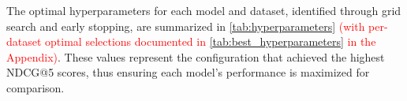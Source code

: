 %

\begin{table}[ht]
\centering
\begin{minipage}{\textwidth}
\begin{mmblock}
\caption{Evaluation results: mean$_{\pm \text{standard deviation}}$ over \RSseeds{}. Bold: best mean per dataset and metric. $^\dagger$KNN is deterministic (single run).}
\label{tab:evaluation_results}
\tiny
\setlength{\tabcolsep}{2pt} %

\end{mmblock}
\end{minipage}
\end{table}

The optimal hyperparameters for each model and dataset, identified through grid search and early stopping, are summarized in \textcolor{red}{\autoref{tab:hyperparameters} (with per-dataset optimal selections documented in \autoref{tab:best_hyperparameters} in the Appendix)}. These values represent the configuration that achieved the highest NDCG@5 scores, thus ensuring each model's performance is maximized for comparison.

